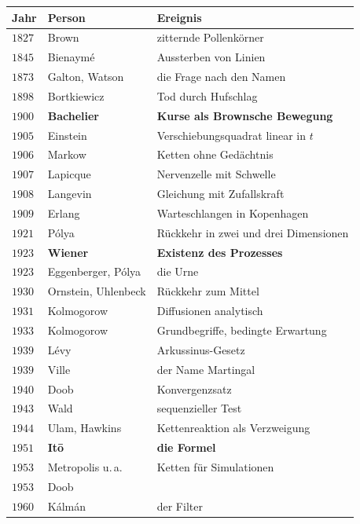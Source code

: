 \begin{merksatz}
\begin{center}
{\small
\renewcommand{\arraystretch}{1.32}
\begin{tabular}{@{}P{1.3cm}P{3.0cm}P{4.0cm}@{}}
\toprule
\textbf{Jahr} & \textbf{Person} & \textbf{Ereignis}\\
\midrule
$1827$ & Brown & zitternde Pollenkörner\\
$1845$ & Bienaymé & Aussterben von Linien\\
$1873$ & Galton, Watson & die Frage nach den Namen\\
$1898$ & Bortkiewicz & Tod durch Hufschlag\\
$1900$ & \textbf{Bachelier} & \textbf{Kurse als Brownsche Bewegung}\\
$1905$ & Einstein & Verschiebungsquadrat linear in $t$\\
$1906$ & Markow & Ketten ohne Gedächtnis\\
$1907$ & Lapicque & Nervenzelle mit Schwelle\\
$1908$ & Langevin & Gleichung mit Zufallskraft\\
$1909$ & Erlang & Warteschlangen in Kopenhagen\\
$1921$ & Pólya & Rückkehr in zwei und drei Dimensionen\\
$1923$ & \textbf{Wiener} & \textbf{Existenz des Prozesses}\\
$1923$ & Eggenberger, Pólya & die Urne\\
$1930$ & Ornstein, Uhlenbeck & Rückkehr zum Mittel\\
$1931$ & Kolmogorow & Diffusionen analytisch\\
$1933$ & Kolmogorow & Grundbegriffe, bedingte Erwartung\\
$1939$ & Lévy & Arkussinus-Gesetz\\
$1939$ & Ville & der Name Martingal\\
$1940$ & Doob & Konvergenzsatz\\
$1943$ & Wald & sequenzieller Test\\
$1944$ & Ulam, Hawkins & Kettenreaktion als Verzweigung\\
$1951$ & \textbf{Itō} & \textbf{die Formel}\\
$1953$ & Metropolis u.\,a. & Ketten für Simulationen\\
$1953$ & Doob & \\
$1960$ & Kálmán & der Filter\\

\end{tabular}}
\end{center}
\end{merksatz}
